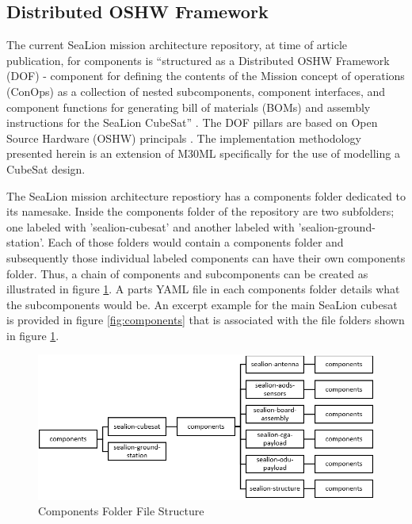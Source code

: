 \documentclass[journal,article,submit,pdftex,moreauthors]{Definitions/mdpi}
\begin{document}
\subsection{Distributed OSHW Framework}
The current SeaLion mission architecture repository, at time of article publication, for components is “structured as a Distributed OSHW Framework (DOF) - component for defining the contents of the Mission concept of operations (ConOps) as a collection of nested subcomponents, component interfaces, and component functions for generating bill of materials (BOMs) and assembly instructions for the SeaLion CubeSat” \cite{sealion_mission_architecture}.  The DOF pillars are based on Open Source Hardware (OSHW) principals \cite{mach30_git}.  The implementation methodology presented herein is an extension of M30ML specifically for the use of modelling a CubeSat design.  
  
The SeaLion mission architecture repostiory has a components folder dedicated to its namesake.  Inside the components folder of the repository are two subfolders; one labeled with 'sealion-cubesat' and another labeled with 'sealion-ground-station'.  Each of those folders would contain a components folder and subsequently those individual labeled components can have their own components folder.  Thus, a chain of components and subcomponents can be created as illustrated in figure \ref{fig:components_file}.  A parts YAML file in each components folder details what the subcomponents would be.  An excerpt example for the main SeaLion cubesat is provided in figure \ref{fig:components} that is associated with the file folders shown in figure \ref{fig:components_file}.

\begin{figure}[H]
    \includegraphics[width=10.5 cm]{assets/components_file.png}
    \caption{Components Folder File Structure}
	\label{fig:components_file}
    \end{figure}   
\unskip
\end{document}
